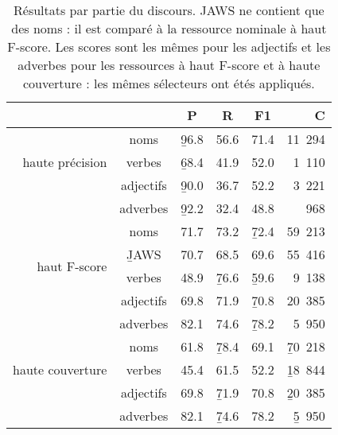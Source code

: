 \begin{table}[ht]
\centering
\begin{tabular}{rccccr}
  \toprule
                                    &           &     P    &     R    & F1       &    C       \\ \hline
  \multirow{3}{*}{haute précision}  & noms      & \b{96.8} & 56.6     & 71.4     & 11~294     \\ 
                                    & verbes    & \b{68.4} & 41.9     & 52.0     &  1~110     \\ 
                                    & adjectifs & \b{90.0} & 36.7     & 52.2     &  3~221     \\
                                    & adverbes  & \b{92.2} & 32.4     & 48.8     &    968     \\ \hline
  \multirow{4}{*}{haut F-score}     & noms      & 71.7     & 73.2     & \b{72.4} & 59~213     \\ 
                                    & \b{JAWS}  & 70.7     & 68.5     & 69.6     &  55~416    \\
                                    & verbes    & 48.9     & \b{76.6} & \b{59.6} &  9~138     \\ 
                                    & adjectifs & 69.8     & 71.9     & \b{70.8} & 20~385     \\
                                    & adverbes  & 82.1     & 74.6     & \b{78.2} &  5~950     \\ \hline
  \multirow{3}{*}{haute couverture} & noms      & 61.8     & \b{78.4} & 69.1     & \b{70~218} \\ 
                                    & verbes    & 45.4     & 61.5     & 52.2     & \b{18~844} \\ 
                                    & adjectifs & 69.8     & \b{71.9} & 70.8     & \b{20~385} \\ 
                                    & adverbes  & 82.1     & \b{74.6} & 78.2     & \b{5~950}  \\
  \bottomrule
\end{tabular}

\caption{\label{table:posfull}Résultats par partie du discours. JAWS ne
    contient que des noms : il est comparé à la ressource nominale à haut
    F-score. Les scores sont les mêmes pour les adjectifs et les adverbes pour
    les ressources à haut F-score et à haute couverture : les mêmes sélecteurs
ont étés appliqués.}

\end{table}

